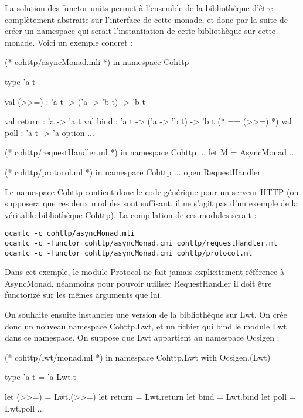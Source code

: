 \documentclass[11pt,a4paper]{report}
\begin{document}
La solution des functor units permet à l'ensemble de la bibliothèque d'être
complètement abstraite sur l'interface de cette monade, et donc par la suite de
créer un namespace qui serait l'instantiation de cette bibliothèque sur cette
monade. Voici un exemple concret :

\begin{OCaml}
(* cohttp/asyncMonad.mli *)
in namespace Cohttp

type 'a t

val (>>=) : 'a t -> ('a -> 'b t) -> 'b t

val return : 'a -> 'a t
val bind : 'a t -> ('a -> 'b t) -> 'b t (* == (>>=) *)
val poll : 'a t -> 'a option
...
\end{OCaml}

\begin{OCaml}
(* cohttp/requestHandler.ml *)
in namespace Cohttp
...
let M = AsyncMonad
...
\end{OCaml}

\begin{OCaml}
(* cohttp/protocol.ml *)
in namespace Cohttp
...
open RequestHandler
\end{OCaml}

Le namespace Cohttp contient donc le code générique pour un serveur HTTP (on
supposera que ces deux modules sont suffisant, il ne s'agit pas d'un exemple de
la véritable bibliothèque Cohttp). La compilation de ces modules serait :
\begin{verbatim}
ocamlc -c cohttp/asyncMonad.mli
ocamlc -c -functor cohttp/asyncMonad.cmi cohttp/requestHandler.ml
ocamlc -c -functor cohttp/asyncMonad.cmi cohttp/protocol.ml
\end{verbatim}

Dans cet exemple, le module Protocol ne fait jamais explicitement référence à
AsyncMonad, néanmoins pour pouvoir utiliser RequestHandler il doit être
functorizé sur les mêmes arguments que lui.

On souhaite ensuite instancier une version de la bibliothèque sur Lwt. On crée
donc un nouveau namespace Cohttp.Lwt, et un fichier qui bind le module Lwt dans
ce namespace. On suppose que Lwt appartient au namespace Ocsigen :
\begin{OCaml}
(* cohttp/lwt/monad.ml *)
in namespace Cohttp.Lwt
with Ocsigen.(Lwt)

type 'a t = 'a Lwt.t

let (>>=) = Lwt.(>>=)
let return = Lwt.return
let bind = Lwt.bind
let poll = Lwt.poll
...
\end{OCaml} 
\end{document}
